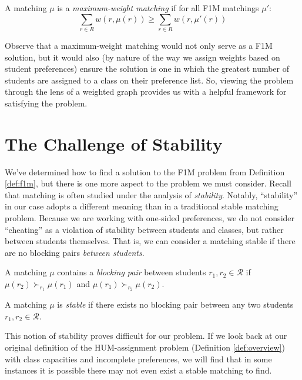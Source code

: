 \begin{definition}
  A matching $\mu$ is a \emph{maximum-weight matching}
  if for all F1M matchings $\mu'$: \[ \sum_{r \in R} w(r, \mu(r)) \geq \sum_{r
      \in R} w(r, \mu'(r)) \]
\end{definition}

Observe that a maximum-weight matching would not only serve as a F1M
solution, but it would also (by nature of the way we assign weights based on
student preferences) ensure the solution is one in which the greatest number
of students are assigned to a class on their preference list. So, viewing the
problem through the lens of a weighted graph provides us with a helpful
framework for satisfying the problem.

\section{The Challenge of Stability} 
We've determined how to find a solution to the F1M problem from Definition
\ref{def:f1m}, but there is one more aspect to the problem we must consider.
Recall that matching is often studied under the analysis of
\textit{stability}. Notably, “stability” in our case adopts a different
meaning than in a traditional stable matching problem. Because we are
working with one-sided preferences, we do not consider “cheating” as a
violation of stability between students and classes, but rather between
students themselves. That is, we can consider a matching stable if there are
no blocking pairs \emph{between students}.

\begin{definition}
  \label{def:blocking-pair}
  A matching $\mu$ contains a  \textit{blocking pair} between
  students $r_1, r_2 \in \mathcal{R}$ if $\mu(r_2) \succ_{r_1} \mu(r_1)$ and
  $\mu(r_1) \succ_{r_2}
    \mu(r_2)$.
\end{definition}


\begin{definition}
  \label{def:stability}
  A matching $\mu$ is \emph{stable} if there exists no blocking pair between any
  two students $r_1, r_2 \in \mathcal{R}$.
\end{definition}

This notion of stability proves difficult for our problem. If we look
back at our original definition of the HUM-assignment problem (Definition
\ref{def:overview}) with class capacities and
incomplete preferences, we will find that in some instances it is possible there
may not even exist a stable matching to find.

